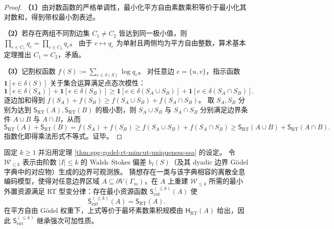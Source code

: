 \begin{proof}
\textbf{（1）}由对数函数的严格单调性，最小化平方自由素数乘积等价于最小化其对数和，得到带权最小割表述。
\par
\textbf{（2）}若存在两组不同割边集 \(C_1\neq C_2\) 皆达到同一极小值，则
\(
\prod_{e\in C_1}q_e=\prod_{e\in C_2}q_e
\)。
由于 \(e\mapsto q_e\) 为单射且两侧均为平方自由整数，算术基本定理推出 \(C_1=C_2\)，矛盾。
\par
\textbf{（3）}记割权函数
\(
f(S):=\sum_{e\in\delta(S)}\log q_e
\)。
对任意边 \(e=\{u,v\}\)，指示函数 \(\mathbf 1[e\in\delta(S)]\) 关于集合运算满足点态次模性：
\[
\mathbf 1[e\in\delta(S_A)]+\mathbf 1[e\in\delta(S_B)]
\ge
\mathbf 1[e\in\delta(S_A\cup S_B)]+\mathbf 1[e\in\delta(S_A\cap S_B)].
\]
逐边加和得到 \(f(S_A)+f(S_B)\ge f(S_A\cup S_B)+f(S_A\cap S_B)\)。
取 \(S_A,S_B\) 分别为达到 \(\mathsf S_{\mathrm{RT}}(A),\mathsf S_{\mathrm{RT}}(B)\) 的极小割，则 \(S_A\cup S_B\) 与 \(S_A\cap S_B\) 分别满足边界条件 \(A\cup B\) 与 \(A\cap B\)，从而
\[
\mathsf S_{\mathrm{RT}}(A)+\mathsf S_{\mathrm{RT}}(B)
=f(S_A)+f(S_B)
\ge f(S_A\cup S_B)+f(S_A\cap S_B)
\ge \mathsf S_{\mathrm{RT}}(A\cup B)+\mathsf S_{\mathrm{RT}}(A\cap B).
\]
指数化即得乘法形式不等式。证毕。
\end{proof}

\begin{conjecture}\label{conj:spg-walsh-stokes-rt-mincut-variational}
固定 \(k\ge 1\) 并沿用定理 \ref{thm:spg-godel-rt-mincut-uniqueness-ssa} 的设定。
令 \(\mathcal W_{\le k}\) 表示由阶数 \(|I|\le k\) 的 Walsh--Stokes 偏差 \(b_I(S)\)（及其 dyadic 边界 Gödel 字典中的对应物）生成的边界可观测族。
猜想存在一类与该字典相容的离散全息编码模型，使得对任意边界区域 \(A\subseteq\partial V(\Gamma_m)\)，在 \(A\) 上重建 \(\mathcal W_{\le k}\) 所需的最小外置资源满足 RT 型变分律：存在最小资源函数 \(\mathsf S_{\mathrm{ext}}^{(\le k)}(A)\) 使
\[
\mathsf S_{\mathrm{ext}}^{(\le k)}(A)=\mathsf S_{\mathrm{RT}}(A).
\]
在平方自由 Gödel 权重下，上式等价于最坏素数乘积规模由 \(\mathsf H_{\mathrm{RT}}(A)\) 给出，因此 \(\mathsf S_{\mathrm{ext}}^{(\le k)}\) 继承强次可加性质。
\end{conjecture}

